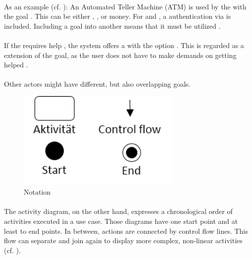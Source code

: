 \paragraph{} As an example (cf. ): An Automated Teller Machine (ATM) is used by the  with the goal . This can be either , , or  money. For  and , a authentication via  is included. Including a goal into another means that it must be utilized \parencite[cf.][639]{ObjectManagementGroup.01.03.2015}. 

\paragraph{} If the  requires help , the system offers a  with the option . This is regarded as a extension of the goal, as the user does not have to make demands on getting helped \parencite[cf.][638-639]{ObjectManagementGroup.01.03.2015}.

\paragraph{} 
Other actors might have different, but also overlapping goals.

\begin{figure}[H]
    \centering
    \includegraphics[width=0.7\textwidth]{img/adSymb.png}
    \caption{Notation}\label{fig:adSymb}
\end{figure}

\paragraph{} The activity diagram, on the other hand, expresses a chronological order of activities executed in a use case. Those diagrams have one start point and at least to end points. In between, actions are connected by control flow lines. This flow can separate and join again to display more complex, non-linear activities  (cf. ).

